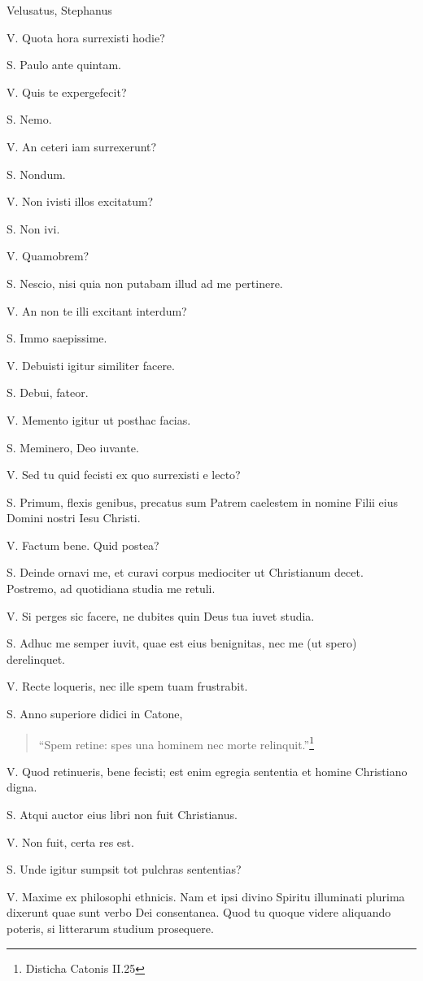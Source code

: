 \documentclass{article}
\begin{document}
Velusatus, Stephanus

 V. Quota hora surrexisti hodie?

S. Paulo ante quintam. 

V. Quis te expergefecit?

S. Nemo. 

V. An ceteri iam surrexerunt?

S. Nondum. 

V. Non ivisti illos excitatum?

S. Non ivi. 

V. Quamobrem?

S. Nescio, nisi quia non putabam illud ad me pertinere. 

V. An non te illi excitant interdum?

S. Immo saepissime. 

V. Debuisti igitur similiter facere. 

S. Debui, fateor. 

V. Memento igitur ut posthac facias. 

S. Meminero, Deo iuvante. 

V. Sed tu quid fecisti ex quo surrexisti e lecto?

S. Primum, flexis genibus, precatus sum Patrem caelestem in nomine Filii eius Domini nostri Iesu Christi. 

V. Factum bene. Quid postea?

S. Deinde ornavi me, et curavi corpus mediociter ut Christianum decet. Postremo, ad quotidiana studia me retuli. 

V. Si perges sic facere, ne dubites quin Deus tua iuvet studia. 

S. Adhuc me semper iuvit, quae est eius benignitas, nec me (ut spero) derelinquet. 

V. Recte loqueris, nec ille spem tuam frustrabit. 

S. Anno superiore didici in Catone, \begin{verse}``Spem retine: spes una hominem nec morte relinquit.''\footnote{Disticha Catonis II.25}\end{verse}

V. Quod retinueris, bene fecisti; est enim egregia sententia et homine Christiano digna. 

S. Atqui auctor eius libri non fuit Christianus. 

V. Non fuit, certa res est. 

S. Unde igitur sumpsit tot pulchras sententias?

V. Maxime ex philosophi ethnicis. Nam et ipsi divino Spiritu illuminati plurima dixerunt quae sunt verbo Dei consentanea. Quod tu quoque videre aliquando poteris, si litterarum studium prosequere. 
\end{document}
